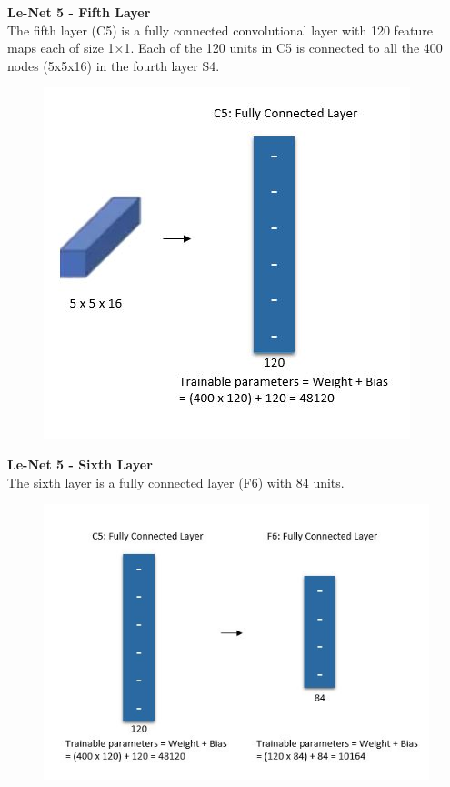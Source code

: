 \documentclass[10pt, compress]{beamer}
\begin{document}
\begin{frame}
  \vspace{0.6cm}
  \textbf{Le-Net 5 - Fifth Layer} \\
  The fifth layer (C5) is a fully connected convolutional layer with 120 feature maps each of size 1×1. Each of the 120 units in C5 is connected to all the 400 nodes (5x5x16) in the fourth layer S4.
  \begin{figure}
    \includegraphics[width=.65\linewidth]{imgs/cnn/LeNet_Layer5}
  \end{figure}
\end{frame}

\begin{frame}
  \vspace{0.6cm}
  \textbf{Le-Net 5 - Sixth Layer} \\
  The sixth layer is a fully connected layer (F6) with 84 units.
  \begin{figure}
    \includegraphics[width=.75\linewidth]{imgs/cnn/LeNet_Layer6}
  \end{figure}
\end{frame}
\end{document}
